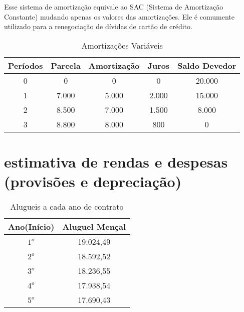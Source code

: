Esse sistema de amortização equivale ao SAC (Sistema de Amortização Constante) mudando apenas os valores das amortizações. Ele é comumente utilizado para a renegociação de dívidas de cartão de crédito.

\begin{table}[h]
    \centering
    \begin{tabular}{|c|c|c|c|c|}
    \hline
       Períodos  &  Parcela & Amortização & Juros & Saldo Devedor\\
    \hline
       0  & 0 & 0 & 0 & 20.000\\
    \hline
    1     & 7.000 & 5.000 & 2.000 & 15.000\\
    \hline
    2     & 8.500 & 7.000 & 1.500 & 8.000\\
    \hline
    3     & 8.800 & 8.000 & 800 & 0\\
    \hline
       \end{tabular}
    \caption{Amortizações Variáveis}
    \label{tab:my_label}
\end{table}
\section{estimativa de rendas e despesas (provisões e depreciação)}


\begin{table}[h]
    \centering
    \begin{tabular}{c|c}
       Ano(Início)  & Aluguel Mençal \\
       \hline
       $1^o$  & 19.024,49\\
       \hline
       $2^o$ & 18.592,52\\
       \hline
       $3^o$ & 18.236,55\\
       \hline
       $4^o$ & 17.938,54\\
       \hline 
       $5^o$ & 17.690,43\\
       \hline
    \end{tabular}
    \caption{Alugueis a cada ano de contrato}
    \label{tab:my_label}
\end{table}



